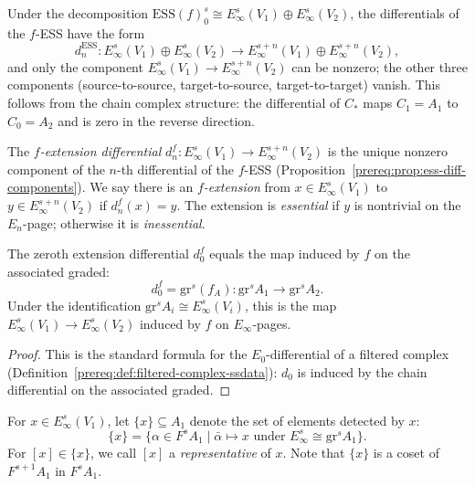 \begin{proposition}\label{prereq:prop:ess-diff-components}
    Under the decomposition $\mathrm{ESS}(f)_0^{s} \cong E_\infty^{s}(V_1) \oplus E_\infty^{s}(V_2)$, the differentials of the $f$-ESS have the form
    $$d_n^{\mathrm{ESS}}: E_\infty^{s}(V_1) \oplus E_\infty^{s}(V_2) \to E_\infty^{s+n}(V_1) \oplus E_\infty^{s+n}(V_2),$$
    and only the component $E_\infty^{s}(V_1) \to E_\infty^{s+n}(V_2)$ can be nonzero; the other three components (source-to-source, target-to-source, target-to-target) vanish. This follows from the chain complex structure: the differential of $C_*$ maps $C_1 = A_1$ to $C_0 = A_2$ and is zero in the reverse direction.
\end{proposition}

\begin{definition}\label{prereq:def:f-extension-diff}
    \leanok
    The \emph{$f$-extension differential} $d_n^f: E_\infty^{s}(V_1) \to E_\infty^{s+n}(V_2)$ is the unique nonzero component of the $n$-th differential of the $f$-ESS (Proposition~\ref{prereq:prop:ess-diff-components}). We say there is an \emph{$f$-extension} from $x \in E_\infty^{s}(V_1)$ to $y \in E_\infty^{s+n}(V_2)$ if $d_n^f(x) = y$. The extension is \emph{essential} if $y$ is nontrivial on the $E_n$-page; otherwise it is \emph{inessential}.
\end{definition}

\begin{proposition}\label{prereq:prop:ess-d0}
    \leanok
    The zeroth extension differential $d_0^f$ equals the map induced by $f$ on the associated graded:
    $$d_0^f = \mathrm{gr}^s(f_A): \mathrm{gr}^s A_1 \to \mathrm{gr}^s A_2.$$
    Under the identification $\mathrm{gr}^s A_i \cong E_\infty^s(V_i)$, this is the map $E_\infty^s(V_1) \to E_\infty^s(V_2)$ induced by $f$ on $E_\infty$-pages.
\end{proposition}
\begin{proof} This is the standard formula for the $E_0$-differential of a filtered complex (Definition~\ref{prereq:def:filtered-complex-ssdata}): $d_0$ is induced by the chain differential on the associated graded.  %
\end{proof}

\begin{notation}\label{prereq:not:representatives}
    \leanok
    For $x \in E_\infty^{s}(V_1)$, let $\{x\} \subseteq A_1$ denote the set of elements detected by $x$:
    $$\{x\} = \{ \alpha \in F^s A_1 \mid \bar{\alpha} \mapsto x \text{ under } E_\infty^{s} \cong \mathrm{gr}^s A_1 \}.$$
    For $[x] \in \{x\}$, we call $[x]$ a \emph{representative} of $x$. Note that $\{x\}$ is a coset of $F^{s+1}A_1$ in $F^s A_1$.
\end{notation}

